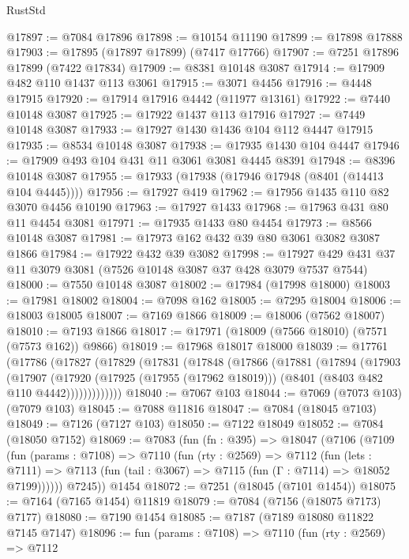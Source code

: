 \begin{lexlean}{RustStd}
\begin{coremodule}
@17897 := @7084 @17896
@17898 := @10154 @11190
@17899 := @17898 @17888
@17903 := @17895 (@17897 @17899) (@7417 @17766)
@17907 := @7251 @17896 @17899 (@7422 @17834)
@17909 := @8381 @10148 @3087
@17914 := @17909 @482 @110 @1437 @113 @3061
@17915 := @3071 @4456
@17916 := @4448 @17915
@17920 := @17914 @17916 @4442 (@11977 @13161)
@17922 := @7440 @10148 @3087
@17925 := @17922 @1437 @113 @17916
@17927 := @7449 @10148 @3087
@17933 := @17927 @1430 @1436 @104 @112 @4447 @17915
@17935 := @8534 @10148 @3087
@17938 := @17935 @1430 @104 @4447
@17946 := @17909 @493 @104 @431 @11 @3061 @3081 @4445 @8391
@17948 := @8396 @10148 @3087
@17955 := @17933 (@17938 (@17946 @17948 (@8401 (@14413 @104 @4445))))
@17956 := @17927 @419
@17962 := @17956 @1435 @110 @82 @3070 @4456 @10190
@17963 := @17927 @1433
@17968 := @17963 @431 @80 @11 @4454 @3081
@17971 := @17935 @1433 @80 @4454
@17973 := @8566 @10148 @3087
@17981 := @17973 @162 @432 @39 @80 @3061 @3082 @3087 @1866
@17984 := @17922 @432 @39 @3082
@17998 := @17927 @429 @431 @37 @11 @3079 @3081 (@7526 @10148 @3087 @37 @428 @3079 @7537 @7544)
@18000 := @7550 @10148 @3087
@18002 := @17984 (@17998 @18000)
@18003 := @17981 @18002
@18004 := @7098 @162
@18005 := @7295 @18004
@18006 := @18003 @18005
@18007 := @7169 @1866
@18009 := @18006 (@7562 @18007)
@18010 := @7193 @1866
@18017 := @17971 (@18009 (@7566 @18010) (@7571 (@7573 @162)) @9866)
@18019 := @17968 @18017 @18000
@18039 := @17761
    (@17786
      (@17827
        (@17829
          (@17831
            (@17848
              (@17866
                (@17881
                  (@17894
                    (@17903
                      (@17907
                        (@17920
                          (@17925 (@17955 (@17962 @18019)))
                          (@8401 (@8403 @482 @110 @4442)))))))))))))
@18040 := @7067 @103
@18044 := @7069 (@7073 @103) (@7079 @103)
@18045 := @7088 @11816
@18047 := @7084 (@18045 @7103)
@18049 := @7126 (@7127 @103)
@18050 := @7122 @18049
@18052 := @7084 (@18050 @7152)
@18069 := @7083
    (fun (fn : @395) =>
    @18047
      (@7106
        (@7109
          (fun (params : @7108) =>
          @7110
            (fun (rty : @2569) =>
            @7112
              (fun (lets : @7111) =>
              @7113 (fun (tail : @3067) => @7115 (fun (Γ : @7114) => @18052 @7199))))))
        @7245))
    @1454
@18072 := @7251 (@18045 (@7101 @1454))
@18075 := @7164 (@7165 @1454) @11819
@18079 := @7084 (@7156 (@18075 @7173) @7177)
@18080 := @7190 @1454
@18085 := @7187 (@7189 @18080 @11822 @7145 @7147)
@18096 := fun (params : @7108) =>
  @7110
    (fun (rty : @2569) =>
    @7112

\end{coremodule}
\end{lexlean}
